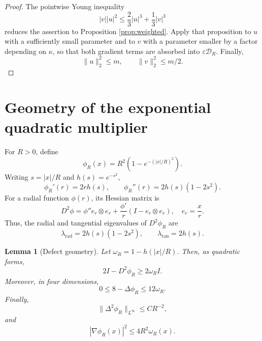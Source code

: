 \documentclass[12pt]{amsart}
\numberwithin{equation}{section}
\newtheorem{lemma}[theorem]{Lemma}
\theoremstyle{remark}
\begin{document}
\begin{proof}
The pointwise Young inequality
\[
 |v||u|^2\le \frac23|u|^3+\frac13|v|^3
\]
reduces the assertion to Proposition \ref{prop:weighted}.  Apply that proposition to $u$ with a sufficiently small parameter and to $v$ with a parameter smaller by a factor depending on $\kappa$, so that both gradient terms are absorbed into $\varepsilon\mathcal D_R$.  Finally,
\[
 \|u\|_2^2\le m, \qquad \|v\|_2^2\le m/2.
\]
\end{proof}

\section{Geometry of the exponential quadratic multiplier}\label{sec:geometry}

For $R>0$, define
\begin{equation*}
 \phi_R(x)=R^2\left(1-e^{-(|x|/R)^2}\right).
\end{equation*}
Writing $s=|x|/R$ and $h(s)=e^{-s^2}$,
\begin{equation*}
 \phi_R'(r)=2rh(s), \qquad \phi_R''(r)=2h(s)(1-2s^2).
\end{equation*}
For a radial function $\phi(r)$, its Hessian matrix is
\[
D^2\phi = \phi'' e_r \otimes e_r + \frac{\phi'}{r} (I-e_r\otimes e_r), \quad e_r = \frac{x}{r}.
\]
Thus, the radial and tangential eigenvalues of $D^2\phi_R$ are
\begin{equation*}
 \lambda_{\mathrm{rad}}=2h(s)(1-2s^2), \qquad \lambda_{\mathrm{tan}}=2h(s).
\end{equation*}

\begin{lemma}[Defect geometry]\label{lem:geometry}
Let $\omega_R=1-h(|x|/R)$.  Then, as quadratic forms,
\begin{equation}\label{eq:hessian-defect}
 2I-D^2\phi_R\ge 2\omega_R I.
\end{equation}
Moreover, in four dimensions,
\begin{equation}\label{eq:theta-bound}
 0\le 8-\Delta \phi_R \le 12\omega_R.
\end{equation}
Finally,
\begin{equation}\label{eq:linear-derivative}
 \|\Delta^2\phi_R\|_{L^\infty}\le CR^{-2},
\end{equation}
and
\begin{equation}\label{eq:virial-geometry}
 |\nabla\phi_R(x)|^2\le4R^2\omega_R(x).
\end{equation}
\end{lemma}
\end{document}
